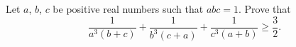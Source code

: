 Let $ a$,  $ b$,  $ c$ be positive real numbers such that $ abc = 1$. Prove that\[ \frac {1}{a^{3}\left(b + c\right)} + \frac {1}{b^{3}\left(c + a\right)} + \frac {1}{c^{3}\left(a + b\right)}\geq \frac {3}{2}.
\]
